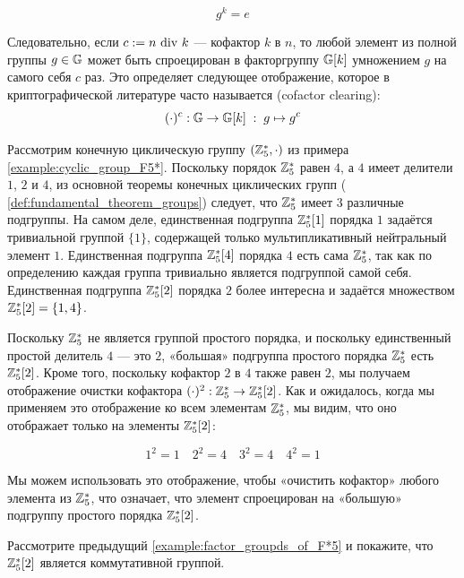 \begin{equation}
g^k = e
\end{equation}

Следовательно, если $c:=n \text{ div } k$ — кофактор $k$ в $n$, то любой элемент из полной группы $g\in \mathbb{G}$ может быть спроецирован в факторгруппу $\mathbb{G}[k]$ умножением $g$ на самого себя $c$ раз. Это определяет следующее отображение, которое в криптографической литературе часто называется  (cofactor clearing):
\begin{equation}
\label{def:cofactor_clearing}
(\cdot)^c: \mathbb{G} \to \mathbb{G}[k]\; : \; g \mapsto g^c
\end{equation}

\begin{example}\label{example:factor_groupds_of_F*5} Рассмотрим конечную циклическую группу $(\mathbb{Z}_5^*,\cdot)$ из примера \ref{example:cyclic_group_F5*}. Поскольку порядок $\mathbb{Z}^*_5$ равен $4$, а $4$ имеет делители $1$, $2$ и $4$, из основной теоремы конечных циклических групп ( \ref{def:fundamental_theorem_groups}) следует, что $\mathbb{Z}^*_5$ имеет $3$ различные подгруппы. На самом деле, единственная подгруппа $\mathbb{Z}^*_5[1]$ порядка $1$ задаётся тривиальной группой $\{1\}$, содержащей только мультипликативный нейтральный элемент $1$. Единственная подгруппа $\mathbb{Z}^*_5[4]$ порядка $4$ есть сама $\mathbb{Z}^*_5$, так как по определению каждая группа тривиально является подгруппой самой себя. Единственная подгруппа $\mathbb{Z}^*_5[2]$ порядка $2$ более интересна и задаётся множеством $\mathbb{Z}^*_5[2]=\{1,4\}$.

Поскольку $\mathbb{Z}^*_5$ не является группой простого порядка, и поскольку единственный простой делитель $4$ — это $2$, «большая» подгруппа простого порядка $\mathbb{Z}^*_5$ есть $\mathbb{Z}^*_5[2]$. Кроме того, поскольку кофактор $2$ в $4$ также равен $2$, мы получаем отображение очистки кофактора $(\cdot)^2:\mathbb{Z}^*_5 \to \mathbb{Z}^*_5[2]$. Как и ожидалось, когда мы применяем это отображение ко всем элементам $\mathbb{Z}^*_5$, мы видим, что оно отображает только на элементы $\mathbb{Z}^*_5[2]$:

\begin{equation}
1^2 = 1\quad{}  2^2 = 4\quad{}  3^2 = 4\quad{}  4^2 = 1
\end{equation}

Мы можем использовать это отображение, чтобы «очистить кофактор» любого элемента из $\mathbb{Z}^*_5$, что означает, что элемент спроецирован на «большую» подгруппу простого порядка $\mathbb{Z}^*_5[2]$.
\end{example}
\begin{exercise}Рассмотрите предыдущий \examplename{} \ref{example:factor_groupds_of_F*5} и покажите, что $\mathbb{Z}^*_5[2]$ является коммутативной группой.
\end{exercise}
